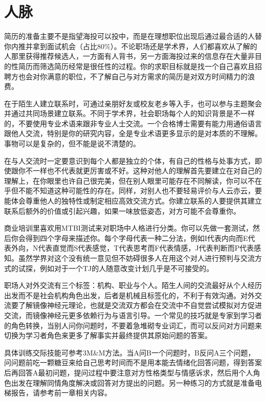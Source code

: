 \documentclass[]{tufte-book}
\begin{document}
\hypertarget{ux4ebaux8109}{%
\section{人脉}\label{ux4ebaux8109}}

简历的准备主要不是指望海投可以投中，而是在理想职位出现后通过最合适的人替你内推并拿到面试机会（占比80\%）。不论职场还是学术界，人们都喜欢从了解的人那里获得推荐候选人，一方面有人背书，另一方面海投过来的信息存在大量非目的性简历而筛选简历经常是很任性的过程。你的求职目标就是找一个自己喜欢且招聘方也会对你满意的职位，不了解自己与对方需求的简历是对双方时间精力的浪费。

在于陌生人建立联系时，可通过亲朋好友或校友老乡等入手，也可以参与主题聚会并通过共同场景建立联系。不同于学术界，社会职场每个人的知识背景是不一样的，不要使用专业术语来跟非专业人士交流。一个合格博士需要有能力用通俗语言跟他人交流，特别是你的研究内容，全是专业术语更多显示的是对本质的不理解。事物可以是复杂的，但不能是说不清楚的。

在与人交流时一定要意识到每个人都是独立的个体，有自己的性格与处事方式，即使跟你不一样也不代表就更厉害或不好。这种对他人的理解首先要建立在对自己的理解上，在你眼里也许自己很完美，但在别人眼里可能存在不同解读，你可以不在乎但不能不知道这种可能性的存在。同样，对别人也不要轻易评价与人云亦云，要能体会尊重他人的独特性或制定相应高效交流方式。你建立联系的人要提供其建立联系后额外的价值或引起兴趣，如果一味放低姿态，对方可能不会尊重你。

商业培训里喜欢用MTBI测试来对职场中人格进行分类。你可以先做一套测试，然后你会得到四个字母来描述你。每个字母代表一种二分法，例如I代表内向而E代表外向，N代表直觉而S代表感觉，T代表思考而F代表情感，J代表判断而P代表感知。虽然学界对这个没有统一意见但不妨碍很多人在用这个对人进行预判与交流方式的试探，例如对于一个TJ的人随意改变计划几乎是不可接受的。

职场人对外交流有三个标签：机构、职业与个人。陌生人间的交流最好从个人经历出发而不是社会机构角色出发，后者是机械且标签化的，不利于有效沟通。对外交流要了解镜像神经元理论，也就是交流双方都会在交流中不自觉尝试模拟对方促进交流，而镜像神经元更多依赖行为与语言引导。一个常见的技巧就是专家到学习者的角色转换，当别人问你问题时，不要着急堆砌专业词汇，而可以反问对方问题来切换为学习者角色来更多了解事实并最终提供其原始问题的答案。

具体训练交际技能可参考3M\&M方法。当A问B一个问题时，B反问A三个问题，问问题前吃一颗糖豆来给自己思考时间而不是用本能去情绪化回答问题，得到答案后再回答A最初问题，提问过程中要注意对方性格类型与情感诉求，然后用个人角色出发在理解同情角度解决或回答对方提出的问题。另一种练习的方式就是准备电梯报告，请参考前一章相关内容。
\end{document}
